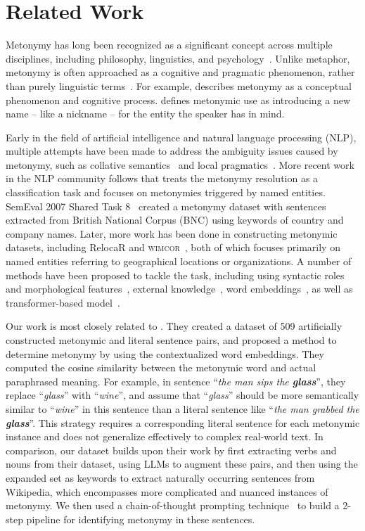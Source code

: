 \section{Related Work}
Metonymy has long been recognized as a significant concept across multiple disciplines,  including philosophy, linguistics, and psychology~\citep{noppen1985metaphor}. Unlike metaphor, metonymy is often approached as a cognitive and pragmatic phenomenon, rather than purely linguistic terms~\citep{maria2015metonymy}. For example, \citet{radden} describes metonymy as a conceptual phenomenon and cognitive process.  \citet{papafragou1996metonymy} defines metonymic use as introducing a new name – like a nickname – for the entity the speaker has in mind. 

Early in the field of artificial intelligence and natural language processing (NLP), multiple attempts have been made to address the ambiguity issues caused by metonymy, such as collative semantics~\citep{fass-1991-met} and local pragmatics~\citep{hobbs1987local}. More recent work in the NLP community follows \citet{markert-nissim-2002-metonymy} that treats the metonymy resolution as a classification task and focuses on metonymies triggered by named entities. SemEval 2007 Shared Task 8~\citep{markert-nissim-2007-semeval} created a metonymy dataset with sentences extracted from British National Corpus (BNC) using keywords of country and company
names. Later, more work has been done in constructing metonymic datasets, including RelocaR \citep{gritta-etal-2017-vancouver} and \textsc{wimcor}~\citep{alex-mathews-strube-2020-large}, both of which focuses primarily on named entities referring to geographical locations or organizations. A number of methods have been proposed to tackle the task, including using syntactic roles and morphological features~\citep{nicolae-etal-2007-utd}, external knowledge~\citep{nastase-strube-2009-combining}, word embeddings~\citep{gritta-etal-2017-vancouver}, as well as transformer-based model~\citep{li-etal-2020-target}.

Our work is most closely related to \citet{pedinotti-lenci-2020-dont}. They created a dataset of 509 artificially constructed metonymic and literal sentence pairs, and proposed a method to determine metonymy by using the contextualized word embeddings. They computed the cosine similarity between the metonymic word and actual paraphrased meaning. For example, in sentence ``\textit{the man sips the \textbf{glass}}'', they replace ``\textit{glass}'' with ``\textit{wine}'', and assume that ``\textit{glass}'' should be more semantically similar to ``\textit{wine}'' in this sentence than a literal sentence like ``\textit{the man grabbed the \textbf{glass}}''. This strategy requires a corresponding literal sentence for each metonymic instance and does not generalize effectively to complex real-world text. In comparison, our dataset builds upon their work by first extracting verbs and nouns from their dataset, using LLMs to augment these pairs, and then using the expanded set as keywords to extract naturally occurring sentences from Wikipedia, which encompasses more complicated and nuanced instances of metonymy. We then used a chain-of-thought prompting technique~\citep{wei-chain-of-thought-prompting} 
to build a 2-step pipeline for identifying metonymy in these sentences.